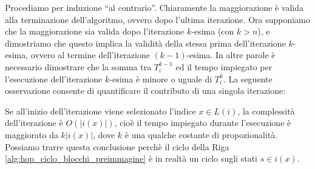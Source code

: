 \begin{proof2}
    Procediamo per induzione ``al contrario''. Chiaramente la maggiorazione è valida alla terminazione dell'algoritmo, ovvero dopo l'ultima iterazione. Ora supponiamo che la maggiorazione sia valida dopo l'iterazione $k$-esima (con $k > n$), e dimostriamo che questo implica la validità della stessa prima dell'iterazione $k$-esima, ovvero al termine dell'iterazione $(k-1)$-esima. In altre parole è necessario dimostrare che la somma tra $T_i^{k-1}$ ed il tempo impiegato per l'esecuzione dell'iterazione $k$-esima è minore o uguale di $T_i^k$. La seguente osservazione consente di quantificare il contributo di una singola iterazione:
    \begin{observation*}
        Se all'inizio dell'iterazione viene selezionato l'indice $x \in L(i)$, la complessità dell'iterazione è $O(|i(x)|)$, cioè il tempo impiegato durante l'esecuzione è maggiorato da $k|i(x)|$, dove $k$ è una qualche costante di propozionalità. Possiamo trarre questa conclusione perchè il ciclo della Riga \ref{alg:hop_ciclo_blocchi_preimmagine} è in realtà un ciclo sugli stati $s\in i(x)$.
    \end{observation*}


\end{proof2}
